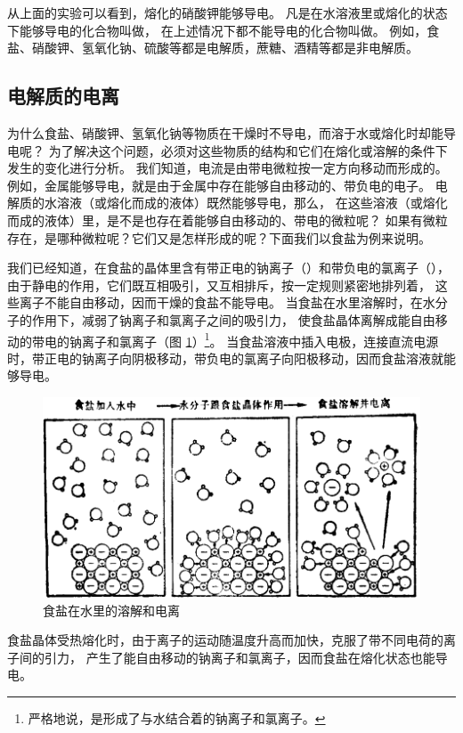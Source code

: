 从上面的实验可以看到，熔化的硝酸钾能够导电。
凡是在水溶液里或熔化的状态下能够导电的化合物叫做，
在上述情况下都不能导电的化合物叫做。
例如，食盐、硝酸钾、氢氧化钠、硫酸等都是电解质，蔗糖、酒精等都是非电解质。


\subsection{电解质的电离}

为什么食盐、硝酸钾、氢氧化钠等物质在干燥时不导电，而溶于水或熔化时却能导电呢？
为了解决这个问题，必须对这些物质的结构和它们在熔化或溶解的条件下发生的变化进行分析。
我们知道，电流是由带电微粒按一定方向移动而形成的。
例如，金属能够导电，就是由于金属中存在能够自由移动的、带负电的电子。
电解质的水溶液（或熔化而成的液体）既然能够导电，那么，
在这些溶液（或熔化而成的液体）里，是不是也存在着能够自由移动的、带电的微粒呢？
如果有微粒存在，是哪种微粒呢？它们又是怎样形成的呢？下面我们以食盐为例来说明。

我们已经知道，在食盐的晶体里含有带正电的钠离子（）和带负电的氯离子（），
由于静电的作用，它们既互相吸引，又互相排斥，按一定规则紧密地排列着，
这些离子不能自由移动，因而干燥的食盐不能导电。
当食盐在水里溶解时，在水分子的作用下，减弱了钠离子和氯离子之间的吸引力，
使食盐晶体离解成能自由移动的带电的钠离子和氯离子（图 \ref{fig:5-2}）\footnote{严格地说，是形成了与水结合着的钠离子和氯离子。}。
当食盐溶液中插入电极，连接直流电源时，带正电的钠离子向阴极移动，带负电的氯离子向阳极移动，因而食盐溶液就能够导电。

\begin{figure}[htbp]
    \centering
    \includegraphics[width=12cm]{../pic/czhx1-ch5-2}
    \caption{食盐在水里的溶解和电离}\label{fig:5-2}
\end{figure}


食盐晶体受热熔化时，由于离子的运动随温度升高而加快，克服了带不同电荷的离子间的引力，
产生了能自由移动的钠离子和氯离子，因而食盐在熔化状态也能导电。


